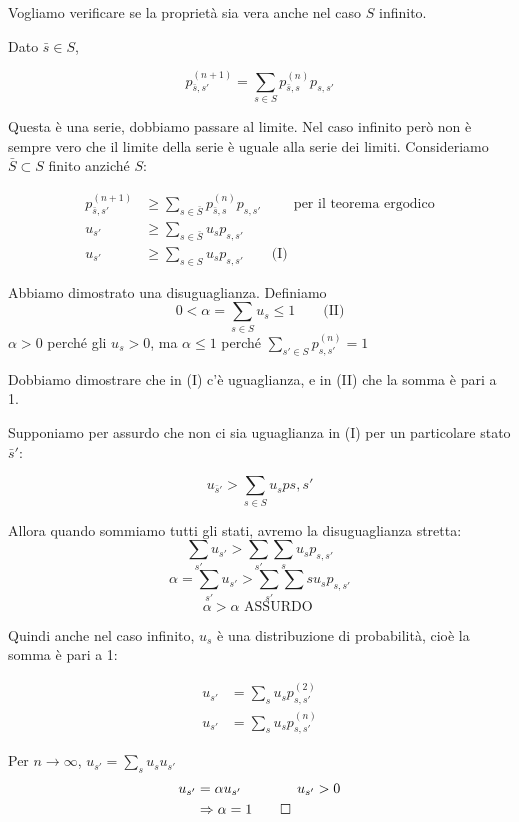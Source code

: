\documentclass[a4paper,12pt]{book}
\begin{document}
Vogliamo verificare se la proprietà sia vera anche nel caso $ S $ infinito. 

Dato $ \bar{s} \in S $,

$$ p_{\bar{s},s'}^{(n+1)} = \sum_{s \in S} p_{\bar{s}, s}^{(n)} p_{s,s'} $$


Questa è una serie, dobbiamo passare al limite. Nel caso infinito però non è sempre vero che il limite della serie è uguale alla serie dei limiti. Consideriamo $ \bar{S} \subset S $ finito anziché $ S $:

\begin{align*}
	p_{\bar{s}, s'}^{(n+1)} & \ge \sum_{s \in \bar{S} } p_{\bar{s},s}^{(n)} p_{s,s'} \qquad \text { per il teorema ergodico} \\
	u_{s'} & \ge \sum_{s \in \bar{S}} u_s p_{s,s'} \\
	u_{s'} & \ge \sum_{s \in S} u_sp_{s,s'} \qquad \text{(I)}
\end{align*}

Abbiamo dimostrato una disuguaglianza. Definiamo 
$$ 0 < \alpha = \sum_{s \in S} u_s \le 1 \qquad \text{(II)} $$
$\alpha > 0$ perché gli $ u_s > 0$, ma $ \alpha \le 1$ perché $ \sum_{s' \in S} p_{s,s'}^{(n)} = 1 $

Dobbiamo dimostrare che in (I) c'è uguaglianza, e in (II) che la somma è pari a 1.

Supponiamo per assurdo che non ci sia uguaglianza in (I) per un particolare stato $\bar{s}'$:

$$ u_{\bar{s}'} > \sum_{s \in S} u_s p{s,s'} $$

Allora quando sommiamo tutti gli stati, avremo la disuguaglianza stretta:
$$ \sum_{s'} u_{s'} > \sum_{s'} \sum_{s} u_s p_{s,s'} $$
$$ \alpha = \sum_{s'} u_{s'} > \sum_{s'} \sum{s} u_s p_{s,s'}$$
$$ \alpha > \alpha \text{ ASSURDO } $$

Quindi anche nel caso infinito, $ u_s $ è una distribuzione di probabilità, cioè la somma è pari a 1:

\begin{align*}
	u_{s'} & = \sum_{s} u_s p_{s,s'}^{(2)} \\
	u_{s'} & = \sum_{s} u_s p_{s,s'} ^{(n)}
\end{align*}

Per $ n \to \infty $, $ u_{s'} = \sum_{s} u_su_{s'}$
\begin{align*}
u_{s'} & = \alpha u_{s'} \qquad \qquad u_{s'} > 0 \\
& \Rightarrow \alpha = 1 \qed
\end{align*}
\end{document}
